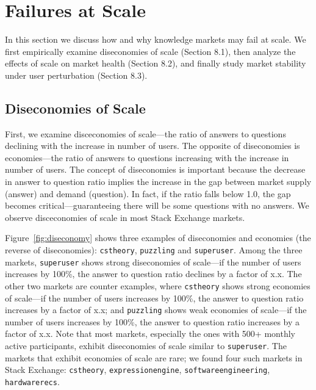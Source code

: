 \section{Failures at Scale}
In this section we discuss how and why knowledge markets may fail at scale. We first empirically examine diseconomies of scale (Section 8.1), then analyze the effects of scale on market health (Section 8.2), and finally study market stability under user perturbation (Section 8.3).

\subsection{Diseconomies of Scale}
First, we examine disceconomies of scale---the ratio of answers to questions declining with the increase in number of users. The opposite of diseconomies is economies---the ratio of answers to questions increasing with the increase in number of users. The concept of diseconomies is important because the decrease in answer to question ratio implies the increase in the gap between market supply (answer) and demand (question). In fact, if the ratio falls below 1.0, the gap becomes critical---guaranteeing there will be some questions with no answers. We observe disceconomies of scale in most Stack Exchange markets.

Figure~\ref{fig:diseconomy} shows three examples of diseconomies and economies (the reverse of diseconomies): \texttt{cstheory}, \texttt{puzzling} and \texttt{superuser}. Among the three markets, \texttt{superuser} shows strong diseconomies of scale---if the number of users increases by 100\%, the answer to question ratio declines by a factor of x.x. The other two markets are counter examples, where \texttt{cstheory} shows strong economies of scale---if the number of users increases by 100\%, the answer to question ratio increases by a factor of x.x; and \texttt{puzzling} shows weak economies of scale---if the number of users increases by 100\%, the answer to question ratio increases by a factor of x.x. Note that most markets, especially the ones with 500+ monthly active participants, exhibit diseconomies of scale similar to \texttt{superuser}. The markets that exhibit economies of scale are rare; we found four such markets in Stack Exchange: \texttt{cstheory}, \texttt{expressionengine}, \texttt{softwareengineering}, \texttt{hardwarerecs}.

